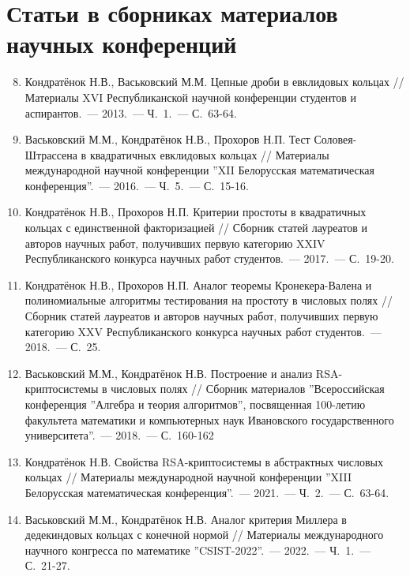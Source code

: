 \documentclass[_00_autoref.tex]{subfiles}
\begin{document}
\vspace{-4ex}
\section*{\fontsize{14}{15}\selectfont Статьи в сборниках материалов научных конференций}
\vspace{-4ex}

\begin{enumerate}
\setcounter{enumi}{7}

    \item \label{source:Republican_Scientific_Conference_of_Students_and_Postgraduates_2013}
    Кондратёнок Н.В., Васьковский М.М. Цепные дроби в евклидовых кольцах // Материалы XVI Республиканской научной конференции студентов и аспирантов.~--- 2013.~--- Ч.~1.~--- С.~63-64.

    \item \label{source:XII_Belarussian_math_conference_2016}
    Васьковский М.М., Кондратёнок Н.В., Прохоров Н.П. Тест Соловея-Штрассена в квадратичных евклидовых кольцах // Материалы международной научной конференции ''XII Белорусская математическая конференция''.~--- 2016.~--- Ч.~5.~--- С.~15-16.

    \item \label{source:Collection_of_articles_by_laureates_2017}
    Кондратёнок Н.В., Прохоров Н.П. Критерии простоты в квадратичных кольцах с единственной факторизацией // Сборник статей лауреатов и авторов научных работ, получивших первую категорию XXIV Республиканского конкурса научных работ студентов.~--- 2017.~--- С.~19-20.

    \item \label{source:Collection_of_articles_by_laureates_2018}
    Кондратёнок Н.В., Прохоров Н.П. Аналог теоремы Кронекера-Валена и полиномиальные алгоритмы тестирования на простоту в числовых полях // Сборник статей лауреатов и авторов научных работ, получивших первую категорию XXV Республиканского конкурса научных работ студентов.~--- 2018.~--- С.~25.

    \item \label{source:Algebra_and_theory_of_algorithms}
    Васьковский М.М., Кондратёнок Н.В. Построение и анализ RSA-криптосистемы в числовых полях // Сборник материалов ''Всероссийская конференция ''Алгебра и теория алгоритмов'', посвященная 100-летию факультета математики и компьютерных наук Ивановского государственного университета''.~--- 2018.~--- С.~160-162

    \item \label{source:XIII_Belarussian_math_conference_2021}
    Кондратёнок Н.В. Свойства RSA-криптосистемы в абстрактных числовых кольцах // Материалы международной научной конференции ''XIII Белорусская математическая конференция''.~--- 2021.~--- Ч.~2.~--- С.~63-64.

    \item \label{source:CSIST_2022}
    Васьковский М.М., Кондратёнок Н.В. Аналог критерия Миллера в дедекиндовых кольцах с конечной нормой // Материалы международного научного конгресса по математике ''CSIST-2022''.~--- 2022.~--- Ч.~1.~--- С.~21-27.

\end{enumerate}
\end{document}
